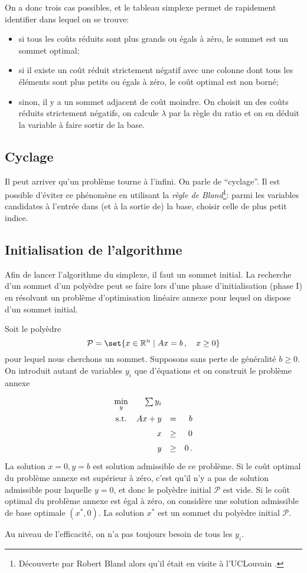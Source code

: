 On a donc trois cas possibles,
et le tableau simplexe permet de rapidement identifier
dans lequel on se trouve:
\begin{itemize}
	\item si tous les coûts réduits sont plus grands ou égals à zéro,
	le sommet est un sommet optimal;
	\item si il existe un coût réduit strictement négatif
	avec une colonne dont tous les éléments sont
	plus petits ou égals à zéro,
	le coût optimal est non borné;
	\item sinon, il y a un sommet adjacent de coût moindre.
	On choisit un des coûts réduits strictement négatifs,
	on calcule $\lambda$ par la règle du ratio
	et on en déduit la variable à faire sortir de la base.
\end{itemize}

\subsection{Cyclage}

Il peut arriver qu'un problème tourne à l'infini.
On parle de ``cyclage''.
Il est possible d'éviter ce phénomène
en utilisant la \emph{règle de Bland}\footnote{Découverte par Robert Bland
alors qu'il était en visite à l'UCLouvain \dSmiley.}:
parmi les variables candidates à l’entrée dans (et à la sortie de) la base,
choisir celle de plus petit indice.

\subsection{Initialisation de l'algorithme}

Afin de lancer l'algorithme du simplexe,
il faut un sommet initial.
La recherche d'un sommet d'un polyèdre peut se faire
lors d'une phase d'initialisation (phase I)
en résolvant un problème d'optimisation linéaire annexe
pour lequel on dispose d'un sommet initial.

Soit le polyèdre
\[
\mathcal{P} = \set{x \in \Rn \suchthat Ax = b\,,\quad x \ge 0}
\]
pour lequel nous cherchons un sommet.
Supposons sans perte de généralité $b \ge 0$.
On introduit autant de variables $y_i$ que d'équations
et on construit le problème annexe
\[
\renewcommand{\arraystretch}{1.5}
\begin{array}{c@{\quad}rcr}
	\min\limits_{y} & \sum y_i &&\\
	\textnormal{s.t.} & Ax + y & = & b\\
	& x & \ge & 0\\
	& y & \ge & 0\,.
\end{array}
\]
La solution $x = 0, y = b$ est solution admissible de ce problème.
Si le coût optimal du problème annexe
est supérieur à zéro,
c’est qu’il n’y a pas de solution admissible pour laquelle $y = 0$,
et donc le polyèdre initial $\mathcal{P}$ est vide.
Si le coût optimal du problème annexe est égal à zéro,
on considère une solution admissible de base optimale $(x^*,0)$.
La solution $x^*$ est un sommet du polyèdre initial $\mathcal{P}$.

Au niveau de l'efficacité,
on n'a pas toujours besoin de tous les $y_i$.
